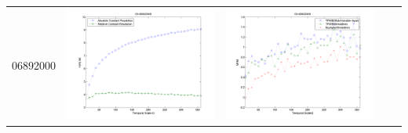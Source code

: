 \documentclass[11pt]{article}
\begin{document}
\begin{table}[H]
{\begin{tabular}{c  c   c   c  c }
06892000&\begin{minipage}{.4\textwidth}\includegraphics[width=\linewidth]{resultgraph/06892000e.png}\end{minipage}
&\begin{minipage}{.4\textwidth}\includegraphics[width=\linewidth]{resultgraph/06892000MI.png}\end{minipage}

\end{tabular}}
\end{table}
\end{document}
